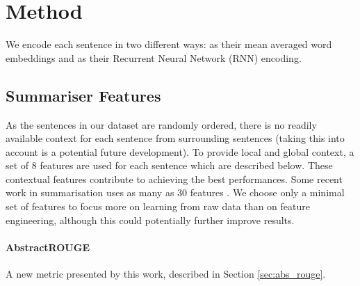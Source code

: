\documentclass[11pt,a4paper]{article}
\begin{document}
\section{Method}





We encode each sentence in two different ways: as their mean averaged word embeddings and as their Recurrent Neural Network (RNN) encoding.

\subsection{Summariser Features}
\label{sec:handcrafted_feats}
 As the sentences in our dataset are randomly ordered, there is no readily available context for each sentence from surrounding sentences (taking this into account is a potential future development). To provide local and global context, a set of 8 features are used for each sentence which are described below. These contextual features contribute to achieving the best performances. Some recent work in summarisation uses as many as 30 features \citep{modernfeaturesDlikman2016, modernfeaturesLitvak2016}. We choose only a minimal set of features to focus more on learning from raw data than on feature engineering, although this could potentially further improve results.

\paragraph{AbstractROUGE}
A new metric presented by this work, described in Section \ref{sec:abs_rouge}.
\end{document}
